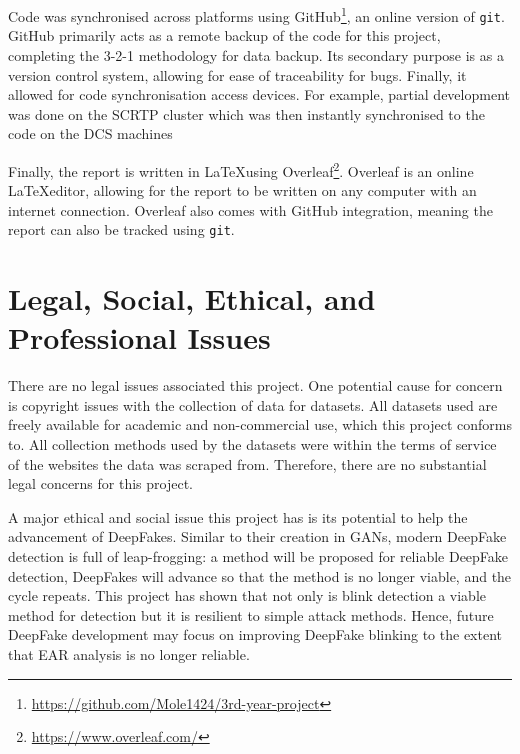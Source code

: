 Code was synchronised across platforms using GitHub\footnote{\url{https://github.com/Mole1424/3rd-year-project}}, an online version of \verb|git|. GitHub primarily acts as a remote backup of the code for this project, completing the 3-2-1 methodology for data backup\cite{seagate321}. Its secondary purpose is as a version control system, allowing for ease of traceability for bugs. Finally, it allowed for code synchronisation access devices. For example, partial development was done on the SCRTP cluster which was then instantly synchronised to the code on the DCS machines

Finally, the report is written in \LaTeX using Overleaf\footnote{\url{https://www.overleaf.com/}}. Overleaf is an online \LaTeX editor, allowing for the report to be written on any computer with an internet connection. Overleaf also comes with GitHub integration, meaning the report can also be tracked using \verb|git|.

\section{Legal, Social, Ethical, and Professional Issues}


There are no legal issues associated this project. One potential cause for concern is copyright issues with the collection of data for datasets. All datasets used are freely available for academic and non-commercial use, which this project conforms to. All collection methods used by the datasets were within the terms of service of the websites the data was scraped from. Therefore, there are no substantial legal concerns for this project.

A major ethical and social issue this project has is its potential to help the advancement of DeepFakes. Similar to their creation in GANs, modern DeepFake detection is full of leap-frogging: a method will be proposed for reliable DeepFake detection, DeepFakes will advance so that the method is no longer viable, and the cycle repeats. This project has shown that not only is blink detection a viable method for detection but it is resilient to simple attack methods. Hence, future DeepFake development may focus on improving DeepFake blinking to the extent that EAR analysis is no longer reliable. 

